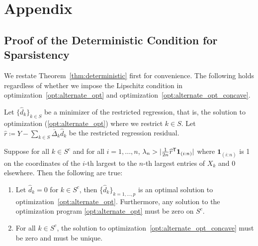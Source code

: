 \section{Appendix}
 
 
 \subsection{Proof of the Deterministic Condition for Sparsistency}
 \label{sec:deterministic_proof}
 
We restate Theorem~\ref{thm:deterministic} first for convenience. 
The following holds regardless of whether we impose the Lipschitz condition in optimization~\ref{opt:alternate_opt} and optimization~\ref{opt:alternate_opt_concave}.

 
\begin{theorem} 
Let $\{\hat{d}_k \}_{k \in S}$ be a minimizer of the restricted regression, that is, the solution to optimization (\ref{opt:alternate_opt}) where we restrict $k \in S$. 
Let $\hat{r} \coloneqq Y - \sum_{k \in S} \bar{\Delta}_k \hat{d}_k$ be the restricted regression residual. 

Suppose for all $k\in S^c$ and for all $i=1,...,n$, $\lambda_n > | \frac{1}{2n}
\widehat{r}^{\mathsf{T}} \mbox{\boldmath $1$}_{(i:n)}|$ where $\mathbf{1}_{(i:n)}$ is 1 on the coordinates of the $i$-th largest to the $n$-th largest entries of $X_k$ and 0 elsewhere.
Then the following are true:
\begin{enumerate}
\item Let $\hat{d}_k = 0$ for $k \in S^c$, then \{$\hat{d}_k\}_{k=1,...,p}$ is an optimal solution to optimization~\ref{opt:alternate_opt}. Furthermore, any solution to the optimization program \ref{opt:alternate_opt} must be zero on $S^c$.
\item For all $k \in S^c$, the solution to optimization~\ref{opt:alternate_opt_concave} must be zero and must be unique.
\end{enumerate}
\end{theorem}


